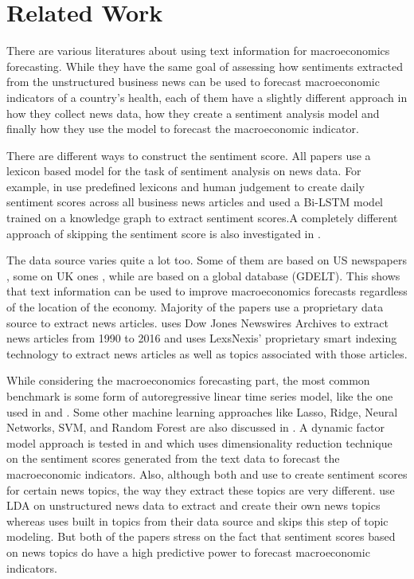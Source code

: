 \documentclass[11pt,a4paper]{article}
\begin{document}
\section{Related Work}

There are various literatures about using text information for macroeconomics forecasting. While they have the same goal of assessing how sentiments extracted from the unstructured business news can be used to forecast macroeconomic indicators of a country's health, each of them have a slightly different approach in how they collect news data, how they create a sentiment analysis model and finally how they use the model to forecast the macroeconomic indicator.

There are different ways to construct the sentiment score. All papers use a lexicon based model for the task of sentiment analysis on news data. For example, in \cite{P1} \cite{P3} \cite{P4} \cite{P5} use predefined lexicons and human judgement to create daily sentiment scores across all business news articles and \cite{P7} used a Bi-LSTM model trained on a knowledge graph to extract sentiment scores.A completely different approach of skipping the sentiment score is also investigated in \cite{P6}.

The data source varies quite a lot too. Some of them are based on US newspapers \cite{P1} \cite{P3}, some on UK ones \cite{P6}, while \cite{P7} are based on a global database (GDELT). This shows that text information can be used to improve macroeconomics forecasts regardless of the location of the economy. Majority of the papers use a proprietary data source to extract news articles. \cite{P5} uses Dow Jones Newswires Archives to extract news articles from 1990 to 2016 and \cite{P4} uses LexsNexis’ proprietary smart indexing technology to extract news articles as well as topics associated with those articles. 

While considering the macroeconomics forecasting part, the most common benchmark is some form of autoregressive linear time series model, like the one used in \cite{P1} and \cite{P7}. Some other machine learning approaches like Lasso, Ridge, Neural Networks, SVM, and Random Forest are also discussed in \cite{P6}. A dynamic factor model approach is tested in \cite{P4} and \cite{P5} which uses dimensionality reduction technique on the sentiment scores generated from the text data to forecast the macroeconomic indicators. Also, although both \cite{P4} and \cite{P5} use to create sentiment scores for certain news topics, the way they extract these topics are very different. \cite{P5} use LDA on unstructured news data to extract and create their own news topics whereas \cite{P4} uses built in topics from their data source and skips this step of topic modeling. But both of the papers stress on the fact that sentiment scores based on news topics do have a high predictive power to forecast macroeconomic indicators.
\end{document}
